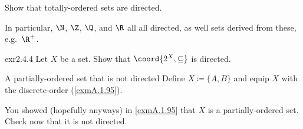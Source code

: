 \begin{exr}{}{}
Show that totally-ordered sets are directed.
\begin{rmk}
In particular, $\N$, $\Z$, $\Q$, and $\R$ all all directed, as well sets derived from these, e.g.~$\R ^+$.
\end{rmk}
\end{exr}
\begin{exr}{}{exr2.4.4}
Let $X$ be a set.  Show that $\coord{2^X,\subseteq}$ is directed.
\end{exr}
\begin{exm}{A partially-ordered set that is not directed}{}
Define $X\coloneqq \{ A,B\}$ and equip $X$ with the discrete-order (\cref{exmA.1.95}).
\begin{exr}{}{}
You showed (hopefully anyways) in \cref{exmA.1.95} that $X$ is a partially-ordered set.  Check now that it is not directed.
\end{exr}
\end{exm}
